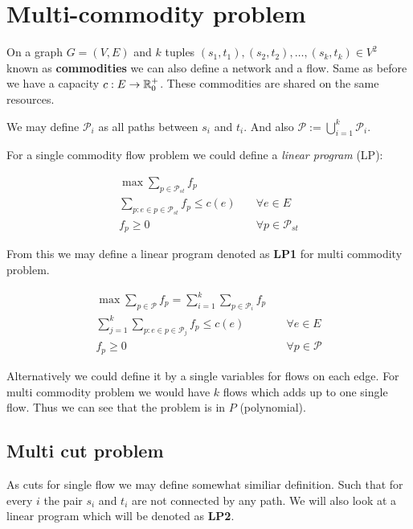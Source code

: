 \chapter{Multi-commodity problem}

On a graph $G = (V,E)$ and $k$ tuples $(s_{1}, t_{1}), (s_{2}, t_{2}), \dots, (s_{k}, t_{k}) \in V^{2}$ known as \textbf{commodities} we can also define a network and a flow. Same as before we have a capacity $c: E \to \mathbb{R}_{0}^{+}$. These commodities are shared on the same resources.

We may define $\mathcal{P}_{i}$ as all paths between $s_{i}$ and $t_{i}$. And also $\mathcal{P} := \bigcup_{i = 1}^{k} \mathcal{P}_{i}$.

For a single commodity flow problem we could define a \textit{linear program} (LP):

$$
\begin{aligned}
	\max \sum_{p \in \mathcal{P}_{st}} f_{p} \\
	\sum_{p: e \in p \in \mathcal{P}_{st}} f_{p} \leq c(e) &\quad \forall e \in E\\
	f_p \geq 0 &\quad \forall p \in \mathcal{P}_{st}
\end{aligned}
$$

From this we may define a linear program denoted as \textbf{LP1} for multi commodity problem.

$$
\begin{aligned}
	\max \sum_{p \in \mathcal{P}} f_{p} = \sum_{i = 1}^{k} \sum_{p \in \mathcal{P}_{i}} f_{p} \\
	\sum_{j = 1}^{k} \sum_{p: e \in p \in \mathcal{P}_{j}} f_{p} \leq c(e) & \quad \forall e \in E\\
	f_p \geq 0 & \quad \forall p \in \mathcal{P}
\end{aligned}
$$

Alternatively we could define it by a single variables for flows on each edge. For multi commodity problem we would have $k$ flows which adds up to one single flow. Thus we can see that the problem is in $P$ (polynomial).

\section{Multi cut problem}

As cuts for single flow we may define somewhat similiar definition. Such that for every $i$ the pair $s_{i}$ and $t_{i}$ are not connected by any path. We will also look at a linear program which will be denoted as \textbf{LP2}.

